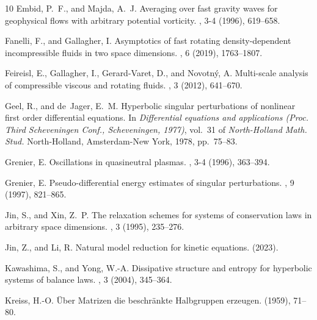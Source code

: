 \documentclass{article}
\theoremstyle{plain}%
\theoremstyle{definition}%
\theoremstyle{remark}%
\newcommand{\+}[1]{{\bm{#1}}}
\begin{document}
\begin{thebibliography}{10}
  {\sc Embid, P.~F., and Majda, A.~J.}
  \newblock Averaging over fast gravity waves for geophysical flows with
    arbitrary potential vorticity.
  , 3-4 (1996), 619--658.
  
  {\sc Fanelli, F., and Gallagher, I.}
  \newblock Asymptotics of fast rotating density-dependent incompressible fluids
    in two space dimensions.
  , 6 (2019), 1763--1807.
  
  {\sc Feireisl, E., Gallagher, I., Gerard-Varet, D., and Novotn\'{y}, A.}
  \newblock Multi-scale analysis of compressible viscous and rotating fluids.
  , 3 (2012), 641--670.
  
  {\sc Geel, R., and de~Jager, E.~M.}
  \newblock Hyperbolic singular perturbations of nonlinear first order
    differential equations.
  \newblock In {\em Differential equations and applications ({P}roc. {T}hird
    {S}cheveningen {C}onf., {S}cheveningen, 1977)}, vol.~31 of {\em North-Holland
    Math. Stud.} North-Holland, Amsterdam-New York, 1978, pp.~75--83.
  
  {\sc Grenier, E.}
  \newblock Oscillations in quasineutral plasmas.
  , 3-4 (1996), 363--394.
  
  {\sc Grenier, E.}
  \newblock Pseudo-differential energy estimates of singular perturbations.
  , 9 (1997), 821--865.
  
  {\sc Jin, S., and Xin, Z.~P.}
  \newblock The relaxation schemes for systems of conservation laws in arbitrary
    space dimensions.
  , 3 (1995), 235--276.
  
  {\sc Jin, Z., and Li, R.}
  \newblock Natural model reduction for kinetic equations.
   (2023).
  
  {\sc Kawashima, S., and Yong, W.-A.}
  \newblock Dissipative structure and entropy for hyperbolic systems of balance
    laws.
  , 3 (2004), 345--364.
  
  {\sc Kreiss, H.-O.}
  \newblock \"{U}ber {M}atrizen die beschr\"{a}nkte {H}albgruppen erzeugen.
   (1959), 71--80.
  

\end{thebibliography}
\end{document}
